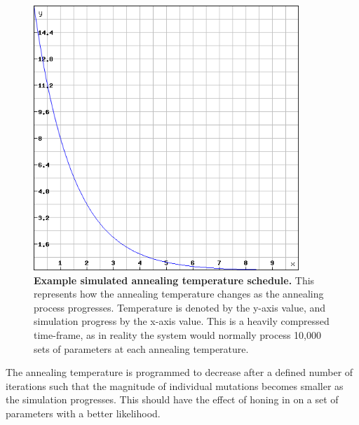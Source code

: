 \begin{figure}[tbp]
	\begin{center}
		\includegraphics[height=10cm]{03-parameterestimationmethodologies/data/temperature.png}
	\caption[Example simulated annealing temperature schedule]{{\bf Example simulated annealing temperature schedule.} This represents how the annealing temperature changes as the annealing process progresses. Temperature is denoted by the y-axis value, and simulation progress by the x-axis value. This is a heavily compressed time-frame, as in reality the system would normally process 10,000 sets of parameters at each annealing temperature.
	\label{fig:temperature}}
	\end{center}
\end{figure}
The annealing temperature is programmed to decrease after a defined number of iterations such that the magnitude of individual mutations becomes smaller as the simulation progresses. This should have the effect of honing in on a set of parameters with a better likelihood.
